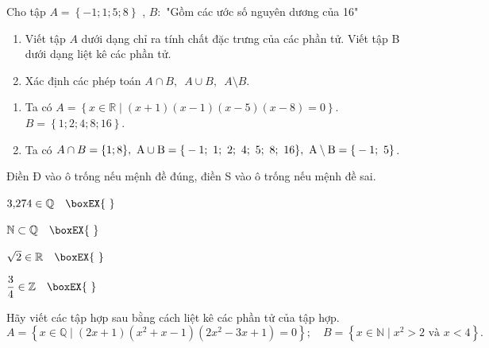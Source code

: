 \begin{bt}%
	Cho tập $A=\left\{{-1;1;5;8}\right\}$ , $B:$ "Gồm các ước số nguyên dương của 16"
	\begin{enumerate}
		\item Viết tập $A$ dưới dạng chỉ ra tính chất đặc trưng của các phần tử. Viết tập B dưới dạng liệt kê các phần tử.
		\item Xác định các phép toán $ A\cap B,\,\,\,A\cup B,\,\,\,A\setminus B$.
	\end{enumerate}
	\loigiai
	{
		\begin{enumerate}
			\item Ta có $A=\left\{x\in \mathbb{R}\mid (x+1)(x-1)(x-5)(x-8)=0\right\}$.\\
			$B=\left\{1;2;4;8;16\right\}$.
			\item Ta có $ A\cap B=\rm{\{}1;8\},\,\,A\cup B=\rm{\{}-1;\,\,1;\,\,2;\,\,4;\,\,5;\,\,8;\,\,16\},\,\,A\setminus B=\rm{\{}-1;\,\,5\}$.
		\end{enumerate}
	}
\end{bt}

\begin{bt}%
	Điền Đ vào ô trống nếu mệnh đề đúng, điền S vào ô trống nếu mệnh đề sai.
	\begin{listEX}[4]
		\item 	$3{,}274 \in \mathbb{Q} \quad \boxEX{~}$
		\item 	$\mathbb{N} \subset \mathbb{Q}\quad \boxEX{~}$
		\item 	$\sqrt{2} \in \mathbb{R}\quad \boxEX{~}$
		\item 	$\dfrac{3}{4} \in \mathbb{Z}\quad \boxEX{~}$
	\end{listEX}
\end{bt}

\begin{bt}%
	 Hãy viết các tập hợp sau bằng cách liệt kê các phần tử của tập hợp.
	$$	A=\left\{x \in \mathbb{Q} \mid(2 x+1)\left(x^{2}+x-1\right)\left(2 x^{2}-3 x+1\right)=0\right\};
	 \quad B=\left\{x \in \mathbb{N} \mid x^{2}>2 \text { và } x<4\right\} .
	$$
\end{bt}

